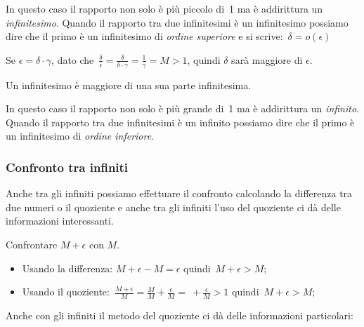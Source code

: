 \begin{osservazione}
In questo caso il rapporto non solo è più piccolo di~1 ma è addirittura un 
\emph{infinitesimo}. 
Quando il rapporto tra due infinitesimi è un infinitesimo 
possiamo dire che il primo è un infinitesimo di \emph{ordine superiore} e si 
scrive:~$\delta=o(\epsilon)$
\end{osservazione}

\begin{esempio}
Se $\epsilon = \delta \cdot \gamma$, dato 
che~$\frac{\delta}{\epsilon}=\frac{\delta}{\delta \cdot \gamma}=
\frac{1}{\gamma}=M>1$, quindi
$\delta$ sarà maggiore di $\epsilon$.

Un infinitesimo è maggiore di una sua parte infinitesima.
\end{esempio}

\begin{osservazione}
In questo caso il rapporto non solo è più grande di~1 ma è addirittura un 
\emph{infinito}. 
Quando il rapporto tra due infinitesimi è un infinito 
possiamo dire che il primo è un infinitesimo di \emph{ordine inferiore}.
\end{osservazione}

\subsubsection{Confronto tra infiniti}
\label{subsubsec:insnum_confrontoreali}

Anche tra gli infiniti possiamo effettuare il confronto calcolando la 
differenza tra due numeri o il quoziente e anche tra gli infiniti l'uso del 
quoziente ci dà delle informazioni interessanti.

\begin{esempio}
Confrontare $M+\epsilon$ con $M$.
\begin{itemize} [noitemsep]
 \item Usando la differenza: $M+\epsilon - M = \epsilon$ 
quindi~$M+\epsilon > M$;
 \item Usando il quoziente:~$\frac{M+\epsilon}{M}= 
\frac{M}{M}+\frac{\epsilon}{M}= \ + \frac{\epsilon}{M} > 1$
quindi~$M+\epsilon > M$;
\end{itemize}
\end{esempio}

\noindent Anche con gli infiniti il metodo del quoziente ci dà delle 
informazioni 
particolari:

